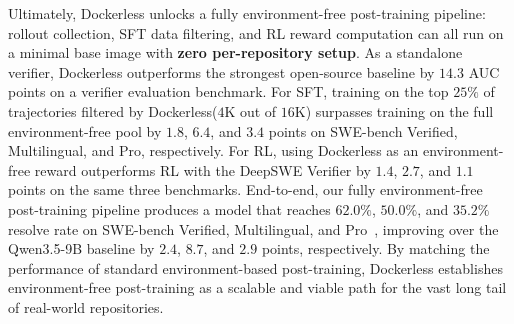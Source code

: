 \documentclass{llmxive}
\providecommand{\approach}{Dockerless\xspace}
\providecommand{\zeng}[1]{\textbf{[Zeng: #1]}}
\providecommand{\he}[1]{\textbf{[He: #1]}}
\begin{document}
Ultimately, \approach unlocks a fully environment-free post-training pipeline: rollout collection, SFT data filtering, and RL reward computation can all run on a minimal base image with \textbf{zero per-repository setup}.
As a standalone verifier, \approach outperforms the strongest open-source baseline by $14.3$ AUC points on a verifier evaluation benchmark.
For SFT, training on the top $25\%$ of trajectories filtered by \approach ($4$K out of $16$K) surpasses training on the full environment-free pool by $1.8$, $6.4$, and $3.4$ points on SWE-bench Verified, Multilingual, and Pro, respectively.
For RL, using \approach as an environment-free reward outperforms RL with the DeepSWE Verifier by $1.4$, $2.7$, and $1.1$ points on the same three benchmarks.
End-to-end, our fully environment-free post-training pipeline produces a model that reaches $62.0\%$, $50.0\%$, and $35.2\%$ resolve rate on SWE-bench Verified, Multilingual, and Pro~\citep{jimenez2024swe,openai2024introducing,yang2025swe,deng2025swe}, improving over the Qwen3.5-9B baseline by $2.4$, $8.7$, and $2.9$ points, respectively.
By matching the performance of standard environment-based post-training, \approach establishes environment-free post-training as a scalable and viable path for the vast long tail of real-world repositories.
\end{document}
